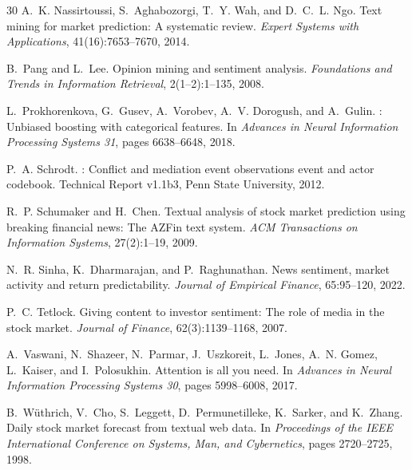\documentclass[12pt,a4paper]{report}
\begin{document}
\begin{thebibliography}{30}
A.~K. Nassirtoussi, S.~Aghabozorgi, T.~Y. Wah, and D.~C.~L. Ngo.
\newblock Text mining for market prediction: A systematic review.
\newblock \textit{Expert Systems with Applications}, 41(16):7653--7670, 2014.

B.~Pang and L.~Lee.
\newblock Opinion mining and sentiment analysis.
\newblock \textit{Foundations and Trends in Information Retrieval},
  2(1--2):1--135, 2008.

L.~Prokhorenkova, G.~Gusev, A.~Vorobev, A.~V. Dorogush, and A.~Gulin.
: Unbiased boosting with categorical features.
\newblock In \textit{Advances in Neural Information Processing Systems 31},
  pages 6638--6648, 2018.

P.~A. Schrodt.
: Conflict and mediation event observations event and actor
  codebook.
\newblock Technical Report v1.1b3, Penn State University, 2012.

R.~P. Schumaker and H.~Chen.
\newblock Textual analysis of stock market prediction using breaking financial
  news: The {AZFin} text system.
\newblock \textit{ACM Transactions on Information Systems}, 27(2):1--19, 2009.

N.~R. Sinha, K.~Dharmarajan, and P.~Raghunathan.
\newblock News sentiment, market activity and return predictability.
\newblock \textit{Journal of Empirical Finance}, 65:95--120, 2022.

P.~C. Tetlock.
\newblock Giving content to investor sentiment: The role of media in the stock
  market.
\newblock \textit{Journal of Finance}, 62(3):1139--1168, 2007.

A.~Vaswani, N.~Shazeer, N.~Parmar, J.~Uszkoreit, L.~Jones, A.~N. Gomez,
  L.~Kaiser, and I.~Polosukhin.
\newblock Attention is all you need.
\newblock In \textit{Advances in Neural Information Processing Systems 30},
  pages 5998--6008, 2017.

B.~W\"{u}thrich, V.~Cho, S.~Leggett, D.~Permunetilleke, K.~Sarker, and
  K.~Zhang.
\newblock Daily stock market forecast from textual web data.
\newblock In \textit{Proceedings of the IEEE International Conference on
  Systems, Man, and Cybernetics}, pages 2720--2725, 1998.

\end{thebibliography}
\end{document}
